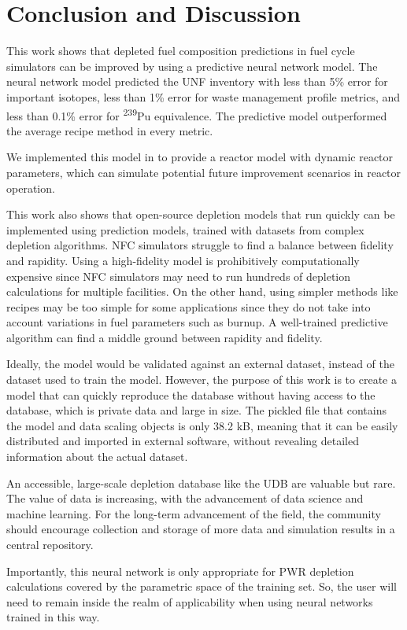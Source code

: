 \section{Conclusion and Discussion}

This work shows that depleted fuel composition predictions
in fuel cycle simulators can be improved
by using a predictive neural network  model.
The neural network model predicted the \gls{UNF} inventory
with less than 5\% error for important isotopes,
less than 1\% error for waste management profile metrics, 
and less than 0.1\% error for \textsuperscript{239}Pu equivalence.
The predictive model outperformed the average recipe
method in every metric.

We implemented this model in \Cyclus to provide a
 reactor model with dynamic reactor parameters,
which can simulate potential future improvement scenarios
in reactor operation.

This work also shows that open-source depletion models
that run quickly
can be implemented using prediction models, trained
with datasets from complex depletion algorithms.
\gls{NFC} simulators struggle to find a balance
between fidelity and rapidity. Using a high-fidelity
model is prohibitively computationally expensive
since \gls{NFC} simulators may need to run
hundreds of depletion calculations for multiple
facilities. On the other hand, using simpler methods
like recipes may be too simple for some applications
since they do not take into account variations in fuel
parameters such as burnup.
A well-trained predictive algorithm can find a middle
ground between rapidity and fidelity.

Ideally, the model would be validated against an external
dataset, instead of the dataset used to train the model.
 However, the purpose
of this work is to create a model that can quickly reproduce the
database without having access to the database, which is private
data
and large in size. The pickled file that contains
the model and data scaling objects is only 38.2 kB, meaning that it
can be easily distributed and imported in external software, without
revealing detailed information about the actual dataset.

An accessible, large-scale depletion database 
like the \gls{UDB} are valuable
but rare. The value of data is increasing,
with the advancement of data science and machine learning.
For the long-term advancement of the field, the
community should encourage collection and storage of more
data and simulation results in
a central repository.

Importantly, this neural network is only appropriate for \gls{PWR} depletion 
calculations covered by the parametric space of the training set. So, the user 
will need to remain inside the realm of applicability when using neural 
networks trained in this way. 
